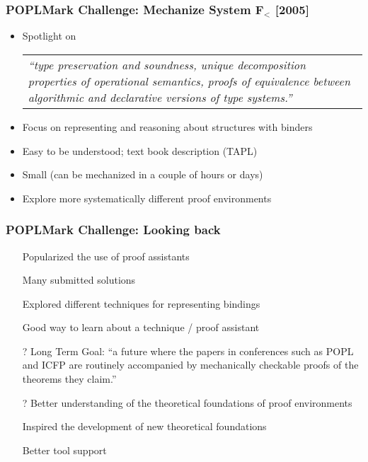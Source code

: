 \begin{frame}\frametitle{POPLMark Challenge: Mechanize System F$_<$ [2005]}%

\begin{itemize}
 \item Spotlight on

 \begin{center}\begin{tabular}{p{10cm}}
 {\small{\emph{``type preservation and soundness, unique decomposition properties of operational semantics, proofs of equivalence between algorithmic and declarative versions of type systems.''}}}
   \end{tabular}
 \end{center}

\item Focus on representing and reasoning about structures with binders
\item Easy to be understood; text book description (TAPL)
\item Small (can be mechanized in a couple of hours or days)
\item Explore more systematically different proof environments
\end{itemize}

\end{frame}

\begin{frame}\frametitle{POPLMark Challenge: Looking  back}%


\begin{itemize}
\item[\checkmark] Popularized the use of proof assistants
\item[\checkmark] Many submitted solutions
\item[\checkmark] Explored different techniques for representing bindings
\item[\checkmark] Good way to learn about a technique / proof assistant\\[1ex]
\vspace{1ex}
\pause
\item[?] Long Term Goal: ``a future where the papers in conferences such as POPL and ICFP are routinely accompanied by mechanically checkable proofs of the theorems they claim.''
\item[?] Better understanding of the theoretical foundations of proof environments
\vspace{1ex}
\pause
\item[\xmark] Inspired the development of new theoretical foundations
\item[\xmark] Better tool support
\end{itemize}

\end{frame}

